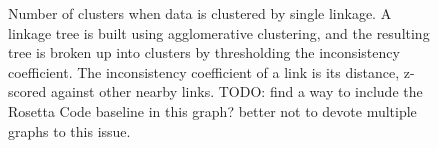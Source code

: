 \documentclass[conference]{IEEEtran}
\begin{document}


\begin{figure}
\caption{Number of clusters when data is clustered by single linkage.
  A linkage tree is built using agglomerative clustering, and the resulting tree is broken up
  into clusters by thresholding the inconsistency coefficient. The inconsistency coefficient
  of a link is its distance, z-scored against other nearby links. TODO: find a way to include
  the Rosetta Code baseline in this graph? better not to devote multiple graphs to this issue.}
\label{fig:diversity}
\end{figure}
\end{document}
